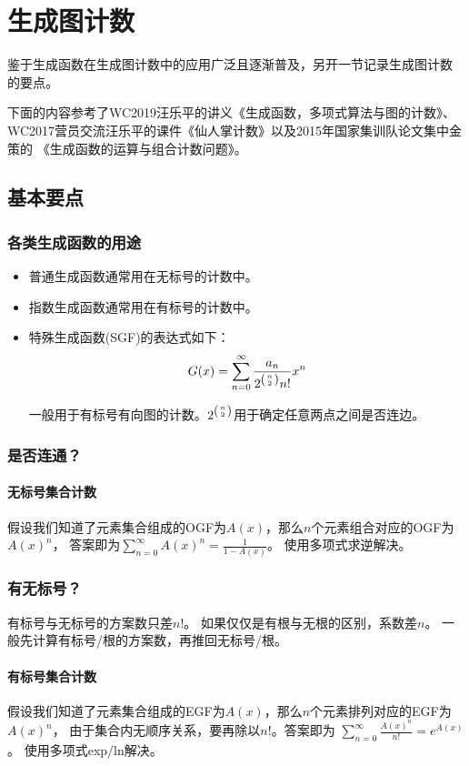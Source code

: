 \section{生成图计数}
鉴于生成函数在生成图计数中的应用广泛且逐渐普及，另开一节记录生成图计数
的要点。

下面的内容参考了WC2019汪乐平的讲义《生成函数，多项式算法与图的计数》、
WC2017营员交流汪乐平的课件《仙人掌计数》以及2015年国家集训队论文集中金策的
《生成函数的运算与组合计数问题》。
\subsection{基本要点}
\subsubsection{各类生成函数的用途}
\begin{itemize}
    \item 普通生成函数通常用在无标号的计数中。
    \item 指数生成函数通常用在有标号的计数中。
    \item 特殊生成函数(SGF)的表达式如下：
    \begin{displaymath}
        G(x)=\sum_{n=0}^\infty{\frac{a_n}{2^{\left(n \atop 2\right)}n!}x^n}
    \end{displaymath}

    一般用于有标号有向图的计数。$2^{\left(n \atop 2\right)}$用于确定任意两点之间是否连边。
\end{itemize}
\subsubsection{是否连通？}
\paragraph{无标号集合计数}
假设我们知道了元素集合组成的OGF为$A(x)$，那么$n$个元素组合对应的OGF为$A(x)^n$，
答案即为$\displaystyle \sum_{n=0}^\infty{A(x)^n}=\frac{1}{1-A(x)}$。
使用多项式求逆解决。
\subsubsection{有无标号？}
有标号与无标号的方案数只差$n!$。
如果仅仅是有根与无根的区别，系数差$n$。
一般先计算有标号/根的方案数，再推回无标号/根。
\paragraph{有标号集合计数}
假设我们知道了元素集合组成的EGF为$A(x)$，那么$n$个元素排列对应的EGF为$A(x)^n$，
由于集合内无顺序关系，要再除以$n!$。答案即为
$\displaystyle \sum_{n=0}^\infty{\frac{A(x)^n}{n!}}=e^{A(x)}$。
使用多项式exp/ln解决。
